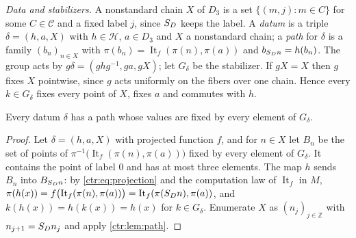 \emph{Data and stabilizers.} A nonstandard chain $X$ of $D_3$ is a set
$\{(m,j):m\in C\}$ for some $C\in\mathcal{C}$ and a fixed label $j$, since
$S_D$ keeps the label. A \emph{datum} is a triple $\delta=(h,a,X)$ with
$h\in\mathscr{H}$, $a\in D_3$ and $X$ a nonstandard chain; a \emph{path} for
$\delta$ is a family $(b_n)_{n\in X}$ with
$\pi(b_n)=\operatorname{It}_f(\pi(n),\pi(a))$ and $b_{S_Dn}=h(b_n)$. The
group acts by $g\delta=(ghg^{-1},ga,gX)$; let $G_\delta$ be the stabilizer. If
$gX=X$ then $g$ fixes $X$ pointwise, since $g$ acts uniformly on the fibers over
one chain. Hence every $k\in G_\delta$ fixes every point of $X$, fixes $a$ and
commutes with $h$.

\begin{lemma}
\label{obs:lem:stabilizer-path}
Every datum $\delta$ has a path whose values are fixed by every element of
$G_\delta$.
\end{lemma}

\begin{proof}
Let $\delta=(h,a,X)$ with projected function $f$, and for $n\in X$ let $B_n$ be
the set of points of $\pi^{-1}\bigl(\operatorname{It}_f(\pi(n),\pi(a))\bigr)$
fixed by every element of $G_\delta$. It contains the point of label $0$ and
has at most three elements. The map $h$ sends $B_n$ into $B_{S_Dn}$: by
\eqref{ctr:eq:projection} and the computation law of $\operatorname{It}_f$ in
$M$, $\pi(h(x))=f\bigl(\operatorname{It}_f(\pi(n),\pi(a))\bigr)
=\operatorname{It}_f(\pi(S_Dn),\pi(a))$, and $k(h(x))=h(k(x))=h(x)$ for
$k\in G_\delta$. Enumerate $X$ as $(n_j)_{j\in\mathbb{Z}}$ with
$n_{j+1}=S_Dn_j$ and apply \cref{ctr:lem:path}.
\end{proof}


